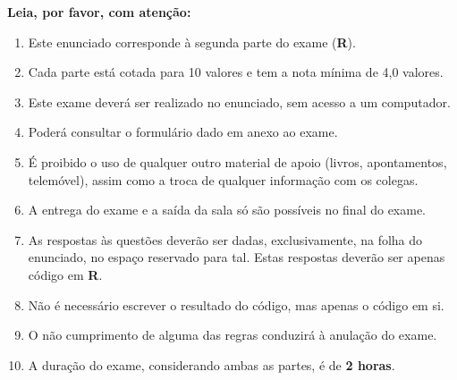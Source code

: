 \documentclass[addpoints]{exam}
\begin{document}
{{\large\textbf{Leia, por favor, com atenção:}}
\begin{enumerate}
	\item Este enunciado corresponde à segunda parte do exame (\textbf{R}).%
	\item Cada parte está cotada para 10 valores e tem a nota mínima de 4,0 valores.
	\item Este exame deverá ser realizado no enunciado, sem acesso a um computador.
	\item Poderá consultar o formulário dado em anexo ao exame.
	\item É proibido o uso de qualquer outro material de apoio (livros, apontamentos, telemóvel), assim como a troca de qualquer informação com os colegas.
	\item A entrega do exame e a saída da sala só são possíveis no final do exame.
	\item As respostas às questões deverão ser dadas, exclusivamente, na folha do enunciado, no espaço reservado para tal. Estas respostas deverão ser apenas código em \textbf{R}.
	\item Não é necessário escrever o resultado do código, mas apenas o código em si.
	\item O não cumprimento de alguma das regras conduzirá à anulação do exame.
	\item A duração do exame, considerando ambas as partes, é de \textbf{2 horas}.
\end{enumerate}

\vspace{10mm}

\begin{questions}
	

\end{questions}}
\end{document}
